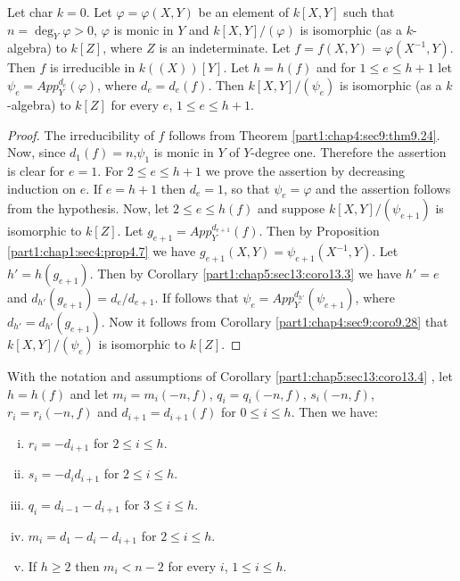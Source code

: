 \begin{coro}\label{part1:chap5:sec13:coro13.4}
  Let char $k=0$. Let $\varphi = \varphi (X, Y)$ be an element of
  $k[X, Y]$ such that $n = \deg_Y \varphi> 0$, $\varphi$ is monic in
  $Y$ and $k[X, Y]/ (\varphi)$ is isomorphic (as a $k$-algebra) to
  $k[Z]$, where $Z$ is an indeterminate. Let $f=f(X, Y)=\varphi
  (X^{-1}, Y)$. Then $f$ is irreducible in $k((X)) [Y]$. Let $h =h(f)$
  and for $1\leq e \leq h+1$ let $\psi_e= App_Y^{d_e}(\varphi)$, where
  $d_e = d_e (f)$. Then $k[X, Y]/(\psi_e)$ is isomorphic (as a
  $k$-algebra) to $k[Z]$ for every $e$, $1 \leq e \leq h+1$.
\end{coro}

\begin{proof}
  The irreducibility of $f$ follows from
  Theorem \ref{part1:chap4:sec9:thm9.24}. Now, since $d_1 (f) =
  n$,\pageoriginale $\psi_1$ is monic in $Y$ of $Y$-degree
  one. Therefore the assertion is clear for $e=1$. For $2 \leq e \leq
  h+1$ we prove the assertion by decreasing induction on $e$. If $e=
  h+1$ then $d_e=1$, so that $\psi_e=\varphi$ and the assertion
  follows from the hypothesis. Now, let $2 \leq e \leq h(f)$ and
  suppose $k[X, Y]/(\psi_{e+1})$ is isomorphic to $k[Z]$. Let
  $g_{e+1}= App_Y^{d_{e+1}}(f)$. Then by
  Proposition \ref{part1:chap1:sec4:prop4.7} we have $g_{e+1}(X, Y)=
  \psi_{e+1} (X^{-1}, Y)$. Let $h' = h(g_{e+1})$. Then by
  Corollary \ref{part1:chap5:sec13:coro13.3} we have $h'=e$ and
  $d_{h'}(g_{e+1}) = d_e/d_{e+1}$. If follows that $\psi_e =
  App_Y^{d_{h'}} (\psi_{e+1})$, where $d_{h'}= d_{h'}
  (g_{e+1})$. Now it follows from Corollary
  \ref{part1:chap4:sec9:coro9.28} that $k[X, Y]/(\psi_e)$ is
  isomorphic to $k[Z]$.   
\end{proof}

\begin{coro}\label{part1:chap5:sec13:coro13.5}
  With the notation and assumptions of
  Corollary \ref{part1:chap5:sec13:coro13.4} , let $h=h(f)$ and let
  $m_i= m_i (-n, f)$, $q_i = q_i(-n, f)$, $s_i (-n, f)$, $r_i=
  r_i(-n, f)$ and $d_{i+1}= d_{i+1}(f)$ for $0 \leq i \leq h$. Then we
  have:
  \begin{enumerate}[(i)]
  \item $r_i =- d_{i+1}$ for $2 \leq i \leq h$.
    \item $s_i =- d_i d_{i+1}$ for $2 \leq i \leq h$.
      \item $q_i= d_{i-1} - d_{i+1}$ for $3 \leq i \leq h$.
        \item $m_i = d_1 - d_i - d_{i+1}$ for $2 \leq i \leq h$.
          \item If $h\geq 2$ then $m_i < n-2$ for every $i$, $1 \leq i
            \leq h$.
  \end{enumerate}
\end{coro}

